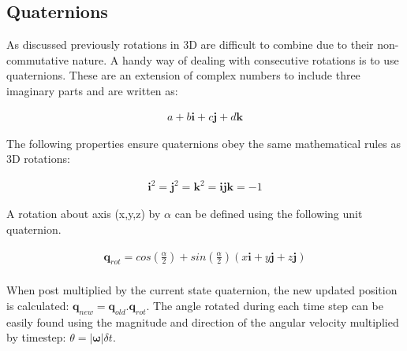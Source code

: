 \documentclass[twoside,twocolumn,12pt]{article}
\begin{document}
\subsection{Quaternions}
As discussed previously rotations in 3D are difficult to combine due to their non-commutative nature. A handy way of dealing with consecutive rotations is to use quaternions. These are an extension of complex numbers to include three imaginary parts and are written as:

\begin{align*}
a + b\textbf{i} + c\textbf{j} + d\textbf{k}
\end{align*}

The following properties ensure quaternions obey the same mathematical rules as 3D rotations:

\begin{align*}
\textbf{i}^2 = \textbf{j}^2 = \textbf{k}^2 = \textbf{ijk} = -1
\end{align*}

A rotation about axis (x,y,z) by $\alpha$ can be defined using the following unit quaternion. 

\begin{gather}
\textbf{q}_{rot} = cos(\frac{\alpha}{2}) + sin(\frac{\alpha}{2})(x\textbf{i} + y\textbf{j} + z\textbf{j}) \nonumber \\
\end{gather}

When post multiplied by the current state quaternion, the new updated position is calculated: $\textbf{q}_{new} = \textbf{q}_{old} . \textbf{q}_{rot}$.
\newline
The angle rotated during each time step can be easily found using the magnitude and direction of the angular velocity multiplied by timestep: $ \theta = | \boldsymbol{\omega} |\delta t$.  \cite{arsalan}
\end{document}
